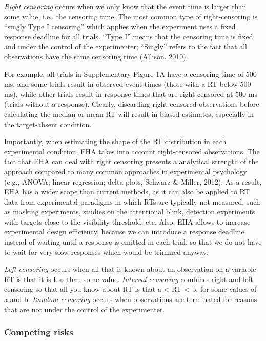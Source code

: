 \documentclass[
  english,
  man,floatsintext]{apa6}
\begin{document}
\emph{Right censoring} occurs when we only know that the event time is larger than some value, i.e., the censoring time. The most common type of right-censoring is ``singly Type I censoring'' which applies when the experiment uses a fixed response deadline for all trials. ``Type I'' means that the censoring time is fixed and under the control of the experimenter; ``Singly'' refers to the fact that all observations have the same censoring time (Allison, 2010).

For example, all trials in Supplementary Figure 1A have a censoring time of 500 ms, and some trials result in observed event times (those with a RT below 500 ms), while other trials result in response times that are right-censored at 500 ms (trials without a response). Clearly, discarding right-censored observations before calculating the median or mean RT will result in biased estimates, especially in the target-absent condition.

Importantly, when estimating the shape of the RT distribution in each experimental condition, EHA takes into account right-censored observations. The fact that EHA can deal with right censoring presents a analytical strength of the approach compared to many common approaches in experimental psychology (e.g., ANOVA; linear regression; delta plots, Schwarz \& Miller, 2012). As a result, EHA has a wider scope than current methods, as it can also be applied to RT data from experimental paradigms in which RTs are typically not measured, such as masking experiments, studies on the attentional blink, detection experiments with targets close to the visibility threshold, etc. Also, EHA allows to increase experimental design efficiency, because we can introduce a response deadline instead of waiting until a response is emitted in each trial, so that we do not have to wait for very slow responses which would be trimmed anyway.

\emph{Left censoring} occurs when all that is known about an observation on a variable RT is that it is less than some value. \emph{Interval censoring} combines right and left censoring so that all you know about RT is that a \textless{} RT \textless{} b, for some values of a and b. \emph{Random censoring} occurs when observations are terminated for reasons that are not under the control of the experimenter.

\subsubsection{Competing risks}\label{competing-risks}
\end{document}
